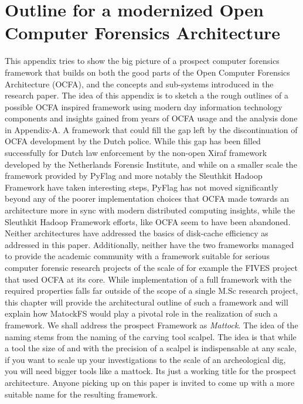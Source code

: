 \chapter{Outline for a modernized Open Computer Forensics Architecture}
This appendix tries to show the big picture of a prospect computer forensics framework that builds on both the good parts of the Open Computer Forensics Architecture (OCFA), and the concepts and sub-systems introduced in the research paper. The idea of this appendix is to sketch a  the rough outlines of a possible OCFA inspired framework using modern day information technology components and insights gained from years of OCFA usage and the analysis done in Appendix-A. A framework that could fill the gap left by the discontinuation of OCFA development by the Dutch police. While this gap has been filled successfully for Dutch law enforcement by the non-open Xiraf framework developed by the Netherlands Forensic Institute, and while on a smaller scale the framework provided by PyFlag and more notably the Sleuthkit Hadoop Framework have taken interesting steps, PyFlag has not moved significantly beyond any of the poorer implementation choices that OCFA made towards an architecture more in sync with modern distributed computing insights, while the Sleuthkit Hadoop Framework efforts, like OCFA seem to have been abandoned. Neither architectures have addressed the basics of disk-cache efficiency as addressed in this paper. Additionally, neither have the two frameworks managed to provide the academic community with a framework suitable for serious computer forensic research projects of the scale of for example the FIVES project that used OCFA at its core. While implementation of a full framework with the required properties falls far outside of the scope of a single M.Sc research project, this chapter will provide the architectural outline of such a framework and will explain how MatockFS would play a pivotal role in the realization of such a framework. We shall address the prospect Framework as \emph{Mattock}. The idea of the naming stems from the naming of the carving tool scalpel. The idea is that while a tool the size of and with the precision of a scalpel is indispensable at any scale, if you want to scale up your investigations to the scale of an archeological dig, you will need bigger tools like a mattock. Its just a working title for the prospect architecture. Anyone picking up on this paper is invited to come up with a more suitable name for the resulting framework. 
